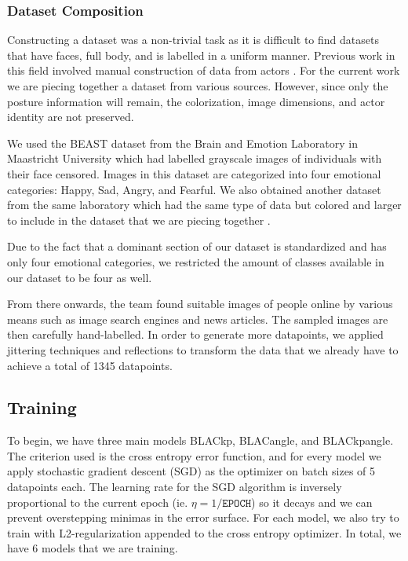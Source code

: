 \documentclass{article}
\begin{document}
\subsubsection{Dataset Composition}
Constructing a dataset was a non-trivial task as it is difficult to find datasets that have faces, full body, and is labelled in a uniform manner. Previous work in this field involved manual construction of data from actors \citep{schindler2008recognizing}. For the current work we are piecing together a dataset from various sources. However, since only the posture information will remain, the colorization, image dimensions, and actor identity are not preserved.

We used the BEAST dataset \citep{de2011bodily} from the Brain and Emotion Laboratory in Maastricht University which had labelled grayscale images of individuals with their face censored. Images in this dataset are categorized into four emotional categories: Happy, Sad, Angry, and Fearful. We also obtained another dataset from the same laboratory which had the same type of data but colored and larger to include in the dataset that we are piecing together \citep{stienen2012computational}.

Due to the fact that a dominant section of our dataset is standardized and has only four emotional categories, we restricted the amount of classes available in our dataset to be four as well.

From there onwards, the team found suitable images of people online by various means such as image search engines and news articles. The sampled images are then carefully hand-labelled. In order to generate more datapoints, we applied jittering techniques and reflections to transform the data that we already have to achieve a total of 1345 datapoints.

\subsection{Training}

To begin, we have three main models BLACkp, BLACangle, and BLACkpangle. The criterion used is the cross entropy error function, and for every model we apply stochastic gradient descent (SGD) as the optimizer on batch sizes of 5 datapoints each. The learning rate for the SGD algorithm is inversely proportional to the current epoch (ie. $\eta = 1/\mathtt{EPOCH}$) so it decays and we can prevent overstepping minimas in the error surface.  For each model, we also try to train with L2-regularization appended to the cross entropy optimizer. In total, we have 6 models that we are training.
\end{document}
